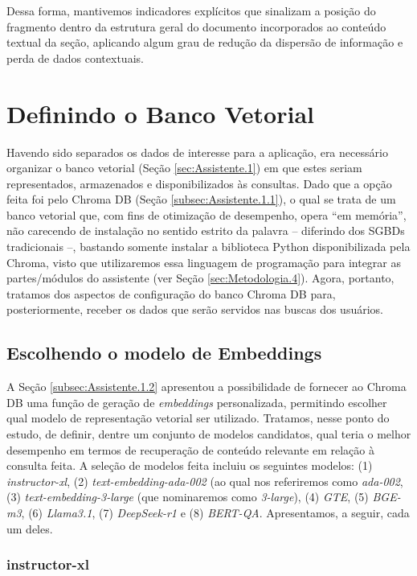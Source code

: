 Dessa forma, mantivemos indicadores explícitos que sinalizam a posição do fragmento dentro da estrutura geral do documento incorporados ao conteúdo textual da seção, aplicando algum grau de redução da dispersão de informação e perda de dados contextuais.

\section{Definindo o Banco Vetorial}
\label{sec:Metodologia.2}
Havendo sido separados os dados de interesse para a aplicação, era necessário organizar o banco vetorial (Seção \ref{sec:Assistente.1}) em que estes seriam representados, armazenados e disponibilizados às consultas. Dado que a opção feita foi pelo Chroma DB (Seção \ref{subsec:Assistente.1.1}), o qual se trata de um banco vetorial que, com fins de otimização de desempenho, opera ``em memória'', não carecendo de instalação no sentido estrito da palavra -- diferindo dos \ac{SGBD}s tradicionais --, bastando somente instalar a biblioteca Python disponibilizada pela Chroma, visto que utilizaremos essa linguagem de programação para integrar as partes/módulos do assistente (ver Seção \ref{sec:Metodologia.4}). Agora, portanto, tratamos dos aspectos de configuração do banco Chroma DB para, posteriormente, receber os dados que serão servidos nas buscas dos usuários.

\subsection{Escolhendo o modelo de Embeddings}
\label{subsec:Metodologia.2.1}
A Seção \ref{subsec:Assistente.1.2} apresentou a possibilidade de fornecer ao Chroma DB uma função de geração de \textit{embeddings} personalizada, permitindo escolher qual modelo de representação vetorial ser utilizado. Tratamos, nesse ponto do estudo, de definir, dentre um conjunto de modelos candidatos, qual teria o melhor desempenho em termos de recuperação de conteúdo relevante em relação à consulta feita. A seleção de modelos feita incluiu os seguintes modelos: (1) \textit{instructor-xl}, (2) \textit{text-embedding-ada-002} (ao qual nos referiremos como \textit{ada-002}, (3) \textit{text-embedding-3-large} (que nominaremos como \textit{3-large}), (4) \textit{GTE}, (5) \textit{BGE-m3}, (6) \textit{Llama3.1}, (7) \textit{DeepSeek-r1} e (8) \textit{BERT-QA}. Apresentamos, a seguir, cada um deles.

\subsubsection{instructor-xl}
\label{subsubsec:Metodologia.2.1.1}

